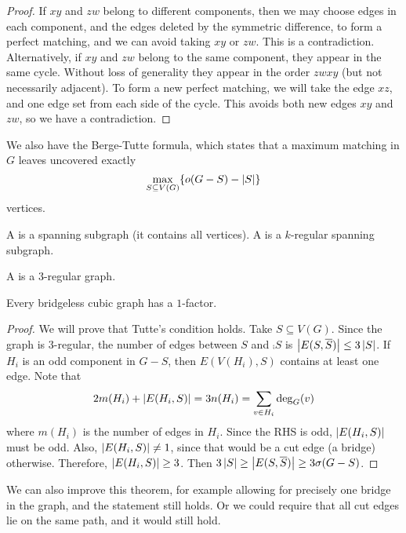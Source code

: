 \begin{proof}
  If $xy$ and $zw$ belong to different components, then we may choose edges in
  each component, and the edges deleted by the symmetric difference, to form a
  perfect matching, and we can avoid taking $xy$ or $zw$.
  This is a contradiction.
  Alternatively, if $xy$ and $zw$ belong to the same component, they appear in
  the same cycle.
  Without loss of generality they appear in the order $zwxy$ (but not
  necessarily adjacent).
  To form a new perfect matching, we will take the edge $xz$, and one edge set
  from each side of the cycle.
  This avoids both new edges $xy$ and $zw$, so we have a contradiction.
\end{proof}


We also have the Berge-Tutte formula, which states that a maximum matching in
$G$ leaves uncovered exactly
\[
  \max_{S \subseteq V(G)} \{o(G - S) - \left| S \right|\}
\]
vertices.


\begin{definition}
  A  is a spanning subgraph (it contains all vertices).
  A  is a $k$-regular spanning subgraph.
\end{definition}

\begin{definition}
  A  is a $3$-regular graph.
\end{definition}

\begin{theorem}[Petersen]
  Every bridgeless cubic graph has a $1$-factor.
\end{theorem}

\begin{proof}
  We will prove that Tutte's condition holds.
  Take $S \subseteq V(G)$.
  Since the graph is $3$-regular, the number of edges between $S$ and $\comp{S}$
  is $\left| E(S,\overline{S}) \right| \le 3 \left| S \right|$.
  If $H_i$ is an odd component in $G - S$, then $E(V(H_i), S)$ contains at least
  one edge.
  Note that
  \[
	2 m(H_i) + \left| E(H_i, S) \right| = 3 n(H_i) = \sum_{v \in H_i} \deg_G(v)
  \]
  where $m(H_i)$ is the number of edges in $H_i$.
  Since the RHS is odd, $\left| E(H_i, S) \right|$ must be odd.
  Also, $\left| E(H_i, S) \right| \ne 1$, since that would be a cut edge (a bridge)
  otherwise.
  Therefore, $\left| E(H_i, S) \right| \ge 3$.
  Then $3 \left| S \right| \ge \left| E(S, \overline{S}) \right| \ge 3 \sigma(G - S)$.
\end{proof}

We can also improve this theorem, for example allowing for precisely one bridge
in the graph, and the statement still holds.
Or we could require that all cut edges lie on the same path, and it would still
hold.

